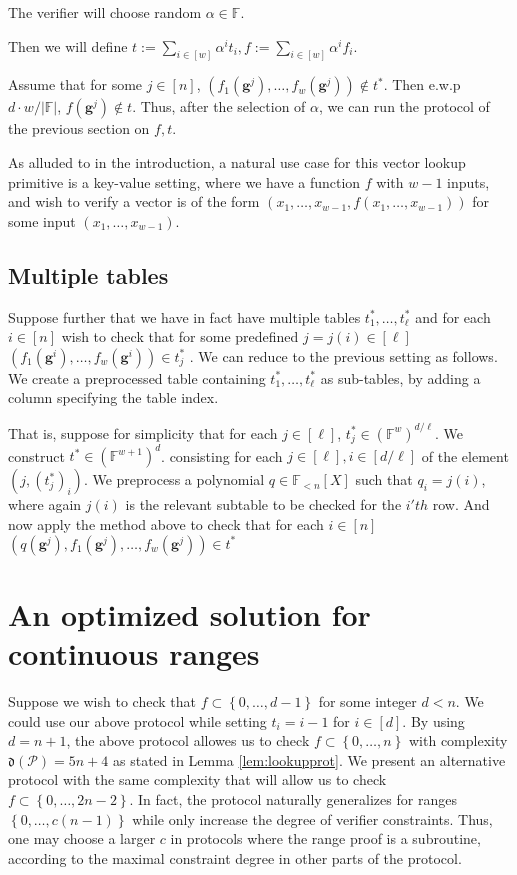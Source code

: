 \documentclass[11pt]{article} %
\newcommand{\F}{\ensuremath{\mathbb F}\xspace}
\newcommand{\defeq}{:=}
\newcommand{\set}[1]{\ensuremath{\left\{#1\right\}}\xspace}
\newcommand{\hgen}{\ensuremath{\mathbf{g}}\xspace}
\newcommand{\polysofdeg}[1]{\ensuremath{\F_{< #1}[X]}\xspace}
\newcommand{\prot}{\ensuremath{\mathscr{P}}\xspace}
\newcommand{\aggdeg}[1]{\ensuremath{\mathfrak{d}(#1)}\xspace}
\begin{document}
The verifier will choose random $\alpha \in \F$.

Then we will define $t\defeq \sum_{i\in [w]} \alpha^i t_i, f \defeq \sum_{i\in [w]} \alpha^i f_i$.

Assume that for some $j\in [n]$, $(f_1(\hgen^j),\ldots,f_w(\hgen^j))\notin t^*$.
Then e.w.p $d\cdot w/|\F|$, $f(\hgen^j)\notin t$.
Thus, after the selection of $\alpha$,
we can run the protocol of the previous section on $f,t$.

As alluded to in the introduction, a natural use case for this vector lookup primitive is a key-value setting, where we have a function $f$ with $w-1$ inputs,
and wish to verify a vector is of the form $(x_1,\ldots,x_{w-1},f(x_1,\ldots,x_{w-1}))$ for some input $(x_1,\ldots,x_{w-1})$.

\subsection{Multiple tables}
Suppose further that we have in fact have multiple tables $t^*_1,\ldots, t^*_\ell$
and for each $i\in [n]$ wish to check that for some predefined $j=j(i)\in [\ell]$  $(f_1(\hgen^i),\ldots,f_w(\hgen^i))\in t^*_j$ .
We can reduce to the previous setting as follows.
We create a preprocessed table containing $t^*_1,\ldots, t^*_\ell$ as sub-tables, by adding a column specifying the table index.

That is, suppose for simplicity that for each $j\in [\ell]$, $t^*_j\in (\F^{w})^{d/\ell}$.
We construct $t^*\in (\F^{w+1})^d$.
consisting for each $j\in [\ell], i\in [d/\ell]$ of the element
$(j,(t^*_j)_i)$.
We preprocess a polynomial $q\in \polysofdeg{n}$
such that $q_i =j(i)$, where again $j(i)$ is the relevant subtable to be checked for the $i'th$ row.
And now apply the method above to check that for each $i\in [n]$
$(q(\hgen^j),f_1(\hgen^j),\ldots,f_w(\hgen^j))\in t^*$

\section{An optimized solution for continuous ranges}\label{sec:ranges}
Suppose we wish to check that $f \subset \set{0,\ldots,d-1}$ for some integer $d< n$.
We could use our above protocol while setting $t_i = i-1$ for $i\in [d]$.
By using $d=n+1$, the above protocol allowes us to check $f\subset \set{0,\ldots,n}$ with complexity $\aggdeg{\prot}=5n+4$ as stated in Lemma \ref{lem:lookupprot}. 
We present an alternative protocol with the same complexity that will allow us to check $f\subset \set{0,\ldots,2n-2}$.
In fact, the protocol naturally generalizes for ranges $\set{0,\ldots,c(n-1)}$ while only increase the degree of verifier constraints. Thus, one may choose a larger $c$ in protocols where the range proof is a subroutine, according to the maximal constraint degree in other parts of the protocol.
\end{document}
